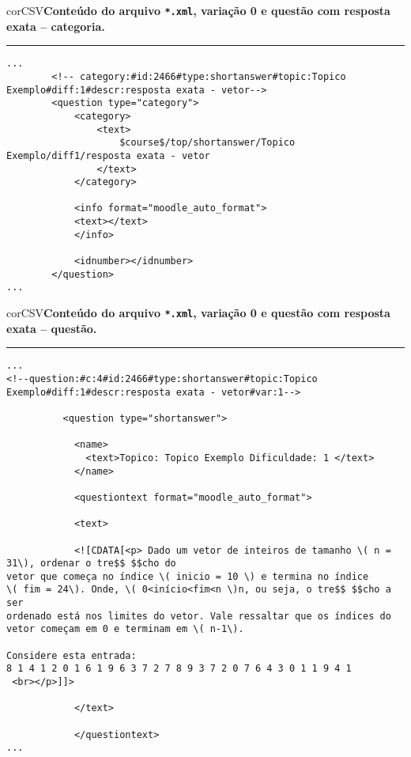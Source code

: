 \begin{myboxCode}{corCSV}{\textbf{Conteúdo do arquivo \texttt{*.xml}, variação 0 e questão com resposta exata -- categoria.}}\vspace{3mm}
\hrule
{\scriptsize
\begin{verbatim}
...
        <!-- category:#id:2466#type:shortanswer#topic:Topico Exemplo#diff:1#descr:resposta exata - vetor-->
        <question type="category">
            <category>
                <text>
                    $course$/top/shortanswer/Topico Exemplo/diff1/resposta exata - vetor
                </text>
            </category>
            
            <info format="moodle_auto_format">
            <text></text>
            </info>
            
            <idnumber></idnumber>
        </question>
...
\end{verbatim}
}
\end{myboxCode}

\begin{myboxCode}{corCSV}{\textbf{Conteúdo do arquivo \texttt{*.xml}, variação 0 e questão com resposta exata -- questão.}}\vspace{3mm}
\hrule
{\scriptsize
\begin{verbatim}
...
<!--question:#c:4#id:2466#type:shortanswer#topic:Topico Exemplo#diff:1#descr:resposta exata - vetor#var:1-->

          <question type="shortanswer">
          
            <name>
              <text>Topico: Topico Exemplo Dificuldade: 1 </text>
            </name>
            
            <questiontext format="moodle_auto_format">
            
            <text>
            
            <![CDATA[<p> Dado um vetor de inteiros de tamanho \( n = 31\), ordenar o tre$$ $$cho do 
vetor que começa no índice \( inicio = 10 \) e termina no índice 
\( fim = 24\). Onde, \( 0<início<fim<n \)n, ou seja, o tre$$ $$cho a ser
ordenado está nos limites do vetor. Vale ressaltar que os índices do 
vetor começam em 0 e terminam em \( n-1\). 

Considere esta entrada:
8 1 4 1 2 0 1 6 1 9 6 3 7 2 7 8 9 3 7 2 0 7 6 4 3 0 1 1 9 4 1
 <br></p>]]>
 
            </text>
 
            </questiontext>         
...
\end{verbatim}
}
\end{myboxCode}


